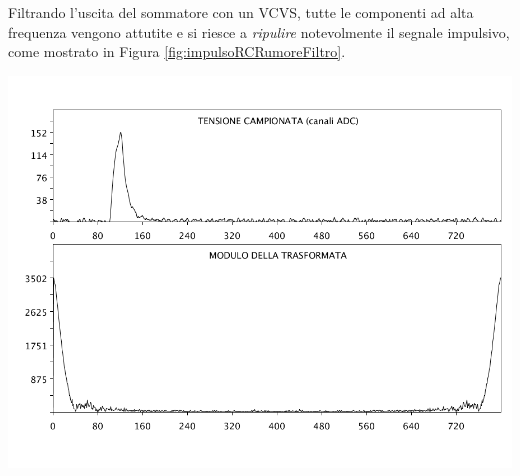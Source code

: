 \documentclass[10pt,oneside,a4paper]{article}
\newenvironment{Figure}
  {\par\medskip\noindent\minipage{\linewidth}}
  {\endminipage\par\medskip}
\begin{document}
\begin{multicols}{2}
Filtrando l'uscita del sommatore con un VCVS, tutte le componenti ad alta frequenza vengono attutite e si riesce a \emph{ripulire} notevolmente il segnale impulsivo, come mostrato in Figura \ref{fig:impulsoRCRumoreFiltro}.
\begin{Figure}
	\begin{center}
	\includegraphics[width=\linewidth]{impulsoRCRumoreFiltro}
	\label{fig:impulsoRCRumoreFiltro}
	\end{center}
\end{Figure}

\end{multicols}


%
%
%


\end{document}
